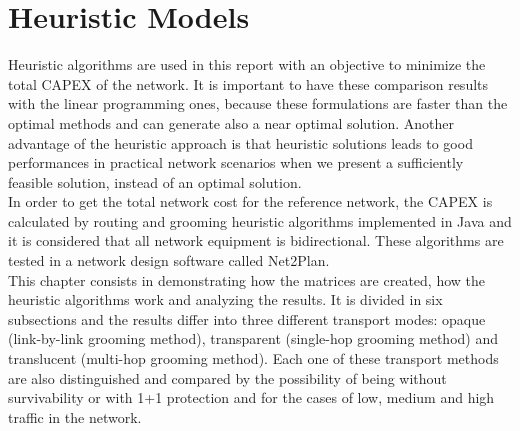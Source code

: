 \chapter{Heuristic Models}

Heuristic algorithms are used in this report with an objective to minimize the total CAPEX of the network. It is important to have these comparison results with the linear programming ones, because these formulations are faster than the optimal methods and can generate also a near optimal solution. Another advantage of the heuristic approach is that heuristic solutions leads to good performances in practical network scenarios when we present a sufficiently feasible solution, instead of an optimal solution.\\
In order to get the total network cost for the reference network, the CAPEX is calculated by routing and grooming heuristic algorithms implemented in Java and it is considered that all network equipment is bidirectional. These algorithms are tested in a network design software called Net2Plan.\\
This chapter consists in demonstrating how the matrices are created, how the heuristic algorithms work and analyzing the results. It is divided in six subsections and the results differ into three different transport modes: opaque (link-by-link grooming method), transparent (single-hop grooming method) and translucent (multi-hop grooming method). Each one of these transport methods are also distinguished and compared by the possibility of being without survivability or with 1+1 protection and for the cases of low, medium and high traffic in the network.








